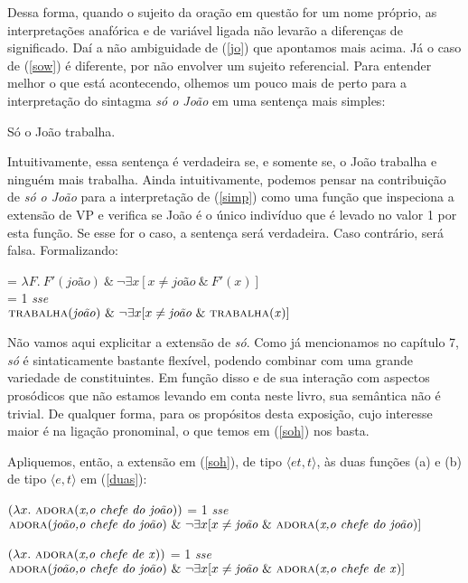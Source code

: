 \n Dessa forma, quando o sujeito da oração em questão for um nome próprio, as interpretações anafórica e de variável ligada não levarão a diferenças de significado. Daí a não ambiguidade de (\ref{jo}) que apontamos mais acima. Já o caso de (\ref{sow}) é diferente, por não envolver um sujeito referencial. Para entender melhor o que está acontecendo, olhemos um pouco mais de perto para a interpretação do sintagma \textit{só o João} em uma sentença mais simples:

\begin{exe}
	\ex Só o João trabalha.  \label{simp}
\end{exe}

Intuitivamente, essa sentença é verdadeira se, e somente se, o João trabalha e ninguém mais trabalha. Ainda intuitivamente, podemos pensar na contribuição de \textit{só o João} para a interpretação de (\ref{simp}) como uma função que inspeciona a extensão de VP e verifica se João é o único indivíduo que é levado no valor 1 por esta função. Se esse for o caso, a sentença será verdadeira. Caso contrário, será falsa. Formalizando:

\begin{exe}
	\ex {} = $\lambda F.\ F'(\textit{joão})\ \&\ \neg\exists x [x\neq \textit{joão}\ \&\ F'(x)]$ \\
	 = 1 \textit{sse}\\
	$\text{\textsc{trabalha}(\textit{joão})}\ \&\ \neg\exists x [x\neq \textit{joão}\ \&\ \text{\textsc{trabalha}(\textit{x})}]$	\label{soh}
\end{exe}

\n Não vamos aqui explicitar a extensão de \textit{só}. Como já mencionamos no capítulo 7, \textit{só} é sintaticamente bastante flexível, podendo combinar com uma grande variedade de constituintes. Em função disso e de sua interação com aspectos prosódicos que não estamos levando em conta neste livro, sua semântica não é trivial. De qualquer forma, para os propósitos desta exposição, cujo interesse maior é na ligação pronominal, o que temos em (\ref{soh}) nos basta.

Apliquemos, então, a extensão em (\ref{soh}), de tipo $\langle et,t\rangle$, às duas funções (a) e (b) de tipo $\langle e,t\rangle$ em (\ref{duas}):

\begin{exe}
	\ex {}$(\lambda x.\ \text{\textsc{adora}(\textit{x,o chefe do joão})})$ = 1 \textit{sse} \\
	$\text{\textsc{adora}(\textit{joão,o chefe do joão})}\  \&\ \neg\exists x [ x\neq
	\textit{joão}\ \&\ \text{\textsc{adora}(\textit{x,o chefe do joão})}]$ \label{duas1}
	
	\ex {}$(\lambda x.\ \text{\textsc{adora}(\textit{x,o chefe de x})})$ = 1 \textit{sse}\\
	 $\predica{adora}{joão,o chefe do joão}\ \&\ \neg\exists x [ x\neq \textit{joão}\ \&\ \predica{adora}{x,o chefe de x}]$  \label{duas2}
\end{exe} 

